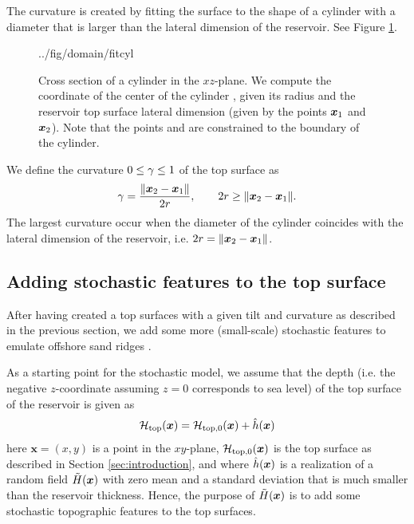 \documentclass[11pt,a4paper]{amsart}
\newenvironment{ovpc}[2]{\begin{overpic}[width=#1\textwidth]{../fig/#2}}{\end{overpic}}
\begin{document}
The curvature
is created by fitting the surface to the shape of a cylinder with a diameter
that is larger than the lateral dimension of the reservoir. See Figure \ref{fig:fcyl}.
\begin{figure}
  \centering
  \begin{ovpc}{.5}{domain/fitcyl}
  \end{ovpc}
  \caption{Cross section of a cylinder in the $xz$-plane. We compute the
    coordinate of the center of the cylinder \domainCylCenter{}, given its radius
    \domainCylRadius{} and the
    reservoir top surface 
    lateral dimension (given by the points $\boldsymbol{x}_1$ and $\boldsymbol{x}_2$). Note
    that the points \domainXA{} and \domainXB{} are constrained to the
    boundary of the cylinder. }
  \label{fig:fcyl}
\end{figure}
We define the curvature $0 \leq \gamma \leq 1$ of the top surface as
\begin{align}
  \label{eq:2}
  \gamma = \frac{\|\boldsymbol{x}_2 - \boldsymbol{x}_1 \|}{2r},
  \qquad 2r \ge \|\boldsymbol{x}_2 - \boldsymbol{x}_1 \|.
\end{align}
The largest curvature occur when the diameter of the cylinder coincides with
the lateral dimension of the reservoir, i.e.
$2r = \|\boldsymbol{x}_2 - \boldsymbol{x}_1 \|$.

\subsection{Adding stochastic features to the top surface}
\label{sec:adding-stoch-feat}
After having created a top surfaces with a given tilt and curvature as
described in the previous section, we add some more (small-scale) stochastic
features to emulate
offshore sand ridges \cite{nil12:imp}.

As a starting point for the stochastic model,
we assume that the depth (i.e. the negative $z$-coordinate assuming
$z=0$ corresponds to sea level) of the top surface of the reservoir is
given as
\begin{align}
  \label{eq:17}
  \mathcal{H}_{\text{top}}(\boldsymbol{x}) = \mathcal{H}_{\text{top,0}}(\boldsymbol{x})
  + \hat{h}(\boldsymbol{x})
\end{align}
here $\boldsymbol{x} = (x, y)$ is a point in the $xy$-plane,
$\mathcal{H}_{\text{top,0}}(\boldsymbol{x})$ is the top surface as described in Section
\ref{sec:introduction}, and
where $\hat{h}(\boldsymbol{x})$ is a realization of a random field
$\tilde{H}(\boldsymbol{x})$ with zero mean and a
standard deviation that is much smaller than the reservoir thickness.
Hence, the purpose of $\tilde{H}(\boldsymbol{x})$
is to add some stochastic topographic features to the top surfaces.
\end{document}
